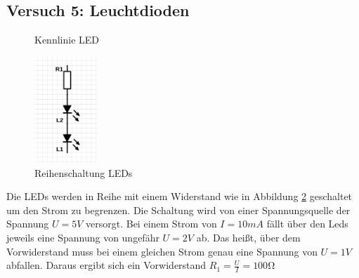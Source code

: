 \documentclass[a4paper]{article}
\begin{document}
\subsection{Versuch 5: Leuchtdioden}

\begin{figure}[H]
    \centering
    \caption{Kennlinie LED}
    \label{fig:kennlinie-led}
\end{figure}

\begin{figure}[H]
    \centering
    \includegraphics[height=4cm]{versuch5/leds.png}
    \caption{Reihenschaltung LEDs}
    \label{fig:leds}
\end{figure}

Die LEDs werden in Reihe mit einem Widerstand wie in Abbildung \ref{fig:leds} geschaltet um den Strom zu begrenzen. Die Schaltung wird von einer Spannungsquelle der Spannung $U=5\si{V}$ versorgt.
Bei einem Strom von $I=10\si{mA}$ fällt über den Leds jeweils eine Spannung von ungefähr $U=2\si{V}$ ab. Das heißt, über dem Vorwiderstand muss bei einem gleichen Strom genau eine Spannung von $U=1\si{V}$ abfallen. Daraus ergibt sich ein Vorwiderstand $R_1=\frac{U}{I}=100\si{\ohm}$
\end{document}
